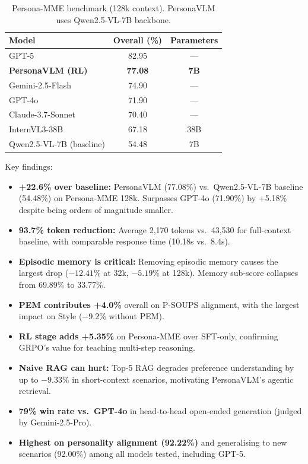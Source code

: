 \documentclass[11pt]{article}
\begin{document}
\begin{table}[h]
\centering
\caption{Persona-MME benchmark (128k context). PersonaVLM uses Qwen2.5-VL-7B backbone.}
\begin{tabular}{lcc}
\toprule
\textbf{Model} & \textbf{Overall (\%)} & \textbf{Parameters} \\
\midrule
GPT-5 & 82.95 & --- \\
\textbf{PersonaVLM (RL)} & \textbf{77.08} & \textbf{7B} \\
Gemini-2.5-Flash & 74.90 & --- \\
GPT-4o & 71.90 & --- \\
Claude-3.7-Sonnet & 70.40 & --- \\
InternVL3-38B & 67.18 & 38B \\
Qwen2.5-VL-7B (baseline) & 54.48 & 7B \\
\bottomrule
\end{tabular}
\end{table}

Key findings:

\begin{itemize}
    \item \textbf{+22.6\% over baseline:} PersonaVLM (77.08\%) vs.\ Qwen2.5-VL-7B baseline (54.48\%) on Persona-MME 128k. Surpasses GPT-4o (71.90\%) by +5.18\% despite being orders of magnitude smaller.

    \item \textbf{93.7\% token reduction:} Average 2,170 tokens vs.\ 43,530 for full-context baseline, with comparable response time (10.18s vs.\ 8.4s).

    \item \textbf{Episodic memory is critical:} Removing episodic memory causes the largest drop ($-12.41\%$ at 32k, $-5.19\%$ at 128k). Memory sub-score collapses from 69.89\% to 33.77\%.

    \item \textbf{PEM contributes +4.0\%} overall on P-SOUPS alignment, with the largest impact on Style ($-9.2\%$ without PEM).

    \item \textbf{RL stage adds +5.35\%} on Persona-MME over SFT-only, confirming GRPO's value for teaching multi-step reasoning.

    \item \textbf{Naive RAG can hurt:} Top-5 RAG degrades preference understanding by up to $-9.33\%$ in short-context scenarios, motivating PersonaVLM's agentic retrieval.

    \item \textbf{79\% win rate vs.\ GPT-4o} in head-to-head open-ended generation (judged by Gemini-2.5-Pro).

    \item \textbf{Highest on personality alignment (92.22\%)} and generalising to new scenarios (92.00\%) among all models tested, including GPT-5.
\end{itemize}
\end{document}

